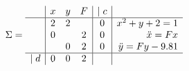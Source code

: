 \documentclass[preview]{standalone}
\begin{document}
$
  \Sigma = \begin{array}{l|*3{c}|c|r}      
    & x & y & F & \bar{c} & \\
    \hline
    &  2 & 2 &  & 0 & x^2 + y+2 = 1 \\
    &  0 &  & 2 & 0 & \ddot{x} = Fx \\
    &   & 0 & 2 & 0 & \ddot{y} = Fy - 9.81\\
    \hline
    \bar{d} & 0 & 0 & 2 & 
    \end{array}
$
\end{document}

